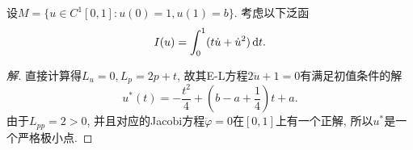 \begin{example}
    设$M = \{u \in C^1[0, 1]\colon u(0) = 1, u(1) = b\}$. 考虑以下泛函 
    \begin{equation*}
        I(u) = \int_0^1(t\dot u + \dot u^2) \,{\rm d}t.
    \end{equation*}
    \begin{proof}[解]\let\qed\relax
        直接计算得$L_u = 0, L_p = 2p + t$, 故其E-L方程$2\ddot u + 1 = 0$有满足初值条件的解
        \begin{equation*}
            u^*(t) = -\frac{t^2}{4} + \left(b - a + \frac{1}{4}\right)t + a.
        \end{equation*}
        由于$L_{pp} = 2 > 0$, 并且对应的Jacobi方程$\ddot\varphi = 0$在$[0, 1]$上有一个正解, 所以$u^*$是一个严格极小点.
    \end{proof}
\end{example}

